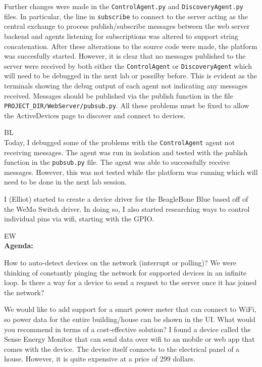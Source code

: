 \documentclass[fontsize=11pt, %
                             paper=letter, %
                             openany, %
                             captions=tableheading,
                             index=totoc,
                             hyperref]{labbook}
\begin{document}
\begin{addmargin}[0cm]{0cm}
Further changes were made in the \texttt{ControlAgent.py} and \texttt{DiscoveryAgent.py} files. In particular, the line in \texttt{subscribe} to connect to the server acting as the central exchange to process publish/subscribe messages between the web server backend and agents listening for subscriptions was altered to support string concatenation. After these alterations to the source code were made, the platform was succesfully started. However, it is clear that no messages published to the server were received by both either the \texttt{ControlAgent} or \texttt{DiscoveryAgent} which will need to be debugged in the next lab or possilby before. This is evident as the terminals showing the debug output of each agent not indicating any messages received. Messages should be published via the publish function in the file \texttt{PROJECT\_DIR/WebServer/pubsub.py}. All these problems must be fixed to allow the ActiveDevices page to discover and connect to devices.
\end{addmargin}

BL\\
Today, I debugged some of the problems with the \texttt{ControlAgent} agent not receiving messages. The agent was run in isolation and tested with the publish function in the \texttt{pubsub.py} file. The agent was able to successfully receive messages. However, this was not tested while the platform was running which will need to be done in the next lab session.

I (Elliot) started to create a device driver for the BeagleBone Blue based off of the WeMo Switch driver. In doing so, I also started researching ways to control individual pins via wifi, starting with the GPIO.


EW\\

\textbf{Agenda:}

How to auto-detect devices on the network (interrupt or polling)? We were thinking of constantly pinging the network for supported devices in an infinite loop. Is there a way for a device to send a request to the server once it has joined the network?

We would like to add support for a smart power meter that can connect to WiFi,
so power data for the entire building/house can be shown in the UI. What would
you recommend in terms of a cost-effective solution? I found a device called the
Sense Energy Monitor that can send data over wifi to an mobile or web app that
comes with the device. The device itself connects to the electrical panel of a
house. However, it is quite expensive at a price of 299 dollars.
\end{document}
